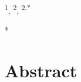 \documentclass[10pt,letterpaper]{article}
\begin{document}
\vspace*{0.2in}


\begin{flushleft}
{\Large
\textbf\newline{
\Title
} %
}
\newline
\\
\AuthorED\textsuperscript{1},
\AuthorPA\textsuperscript{2},
\AuthorLP\textsuperscript{2,*}
\\
\bigskip
\Address
\bigskip

%
%





* \EmailLP

\end{flushleft}
\section*{Abstract}
\Abstract
\end{document}
